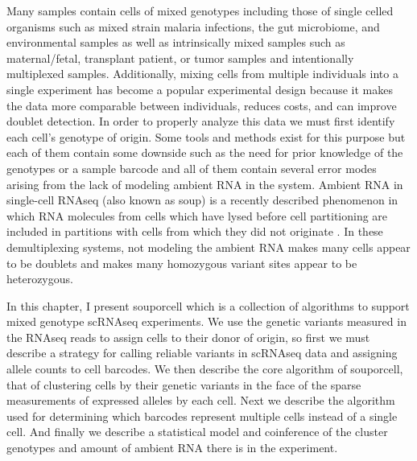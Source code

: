Many samples contain cells of mixed genotypes including those of single celled organisms such as mixed strain malaria infections, 
the gut microbiome, and environmental samples as well 
as intrinsically mixed samples such as maternal/fetal, transplant patient, or tumor samples and intentionally multiplexed samples.
Additionally, mixing cells from multiple individuals into a single experiment has become a popular experimental design because it makes the data more comparable between individuals, reduces costs, and can improve doublet detection. 
 In order to properly 
analyze this data we must first identify each cell's genotype of origin. Some tools and methods exist for this purpose \cite{demuxlet} \cite{cellhashing} \cite{scsplit} 
but each of them contain some downside such as the need for prior knowledge of the genotypes or a sample barcode and all of them 
contain several error modes arising from the lack of modeling ambient RNA in the system. Ambient RNA in single-cell RNAseq (also known as soup) is a recently described 
phenomenon in which RNA molecules from cells which have lysed before cell partitioning are included in partitions with cells from which they did not originate \cite{soupx}. 
In these demultiplexing systems, not modeling the ambient RNA makes many cells appear to be doublets and makes many homozygous variant sites appear to be 
heterozygous. 


In this chapter, I present souporcell which is a collection of algorithms to support mixed genotype scRNAseq experiments. 
We use the genetic variants measured in the RNAseq reads to assign cells to their donor of origin, so first we must describe a strategy for calling reliable variants in scRNAseq data and assigning allele counts to cell barcodes. We then describe the core algorithm of souporcell, that of clustering cells by their genetic variants in the face of the sparse measurements of expressed alleles by each cell. Next we describe the algorithm used for determining which barcodes represent multiple cells instead of a single cell. And finally we describe a statistical model and coinference of the cluster genotypes and amount of ambient RNA there is in the experiment.  


